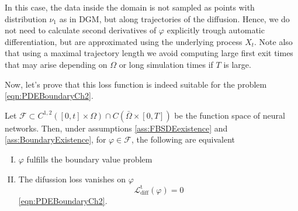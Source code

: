 In this case, the data inside the domain is not sampled as points with distribution $\nu_1$ as in DGM, but along trajectories of the diffusion. Hence, we do not need to calculate second derivatives of $\varphi$ explicitly trough automatic differentiation, but are approximated using the underlying process $X_t$. Note also that using a maximal trajectory length we avoid computing large first exit times that may arise depending on $\Omega$ or long simulation times if $T$ is large. 

Now, let's prove that this loss function is indeed suitable for the problem \eqref{eqn:PDEBoundaryCh2}.
\begin{theorem}
	Let $\mathcal{F}\subset C^{1,2}([0,t]\times \Omega) \cap C(\bar{\Omega} \times [0,T])$ be the function space of neural networks. Then, under assumptions \ref{ass:FBSDEexistence} and \ref{ass:BoundaryExistence}, for $\varphi\in \mathcal{F}$, the following are equivalent
	\begin{enumerate}[I.]
		\item $\varphi$ fulfills the boundary value problem
		\item The difussion loss vanishes on $\varphi$ 
		\begin{equation}
			\mathcal{L}_{\text{diff}}^{\mathrm{t}}(\varphi)=0
		\end{equation}
	 \eqref{eqn:PDEBoundaryCh2}.
	\end{enumerate}
\end{theorem}
